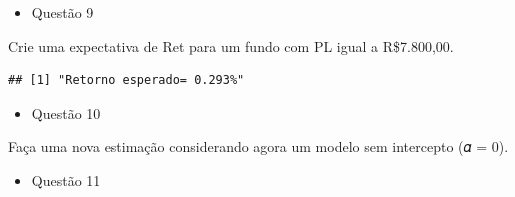 \documentclass[
]{article}
\newenvironment{Shaded}{\begin{snugshade}}{\end{snugshade}}
\newcommand{\AttributeTok}[1]{\textcolor[rgb]{0.77,0.63,0.00}{#1}}
\newcommand{\DecValTok}[1]{\textcolor[rgb]{0.00,0.00,0.81}{#1}}
\newcommand{\FunctionTok}[1]{\textcolor[rgb]{0.00,0.00,0.00}{#1}}
\newcommand{\NormalTok}[1]{#1}
\newcommand{\OtherTok}[1]{\textcolor[rgb]{0.56,0.35,0.01}{#1}}
\newcommand{\SpecialCharTok}[1]{\textcolor[rgb]{0.00,0.00,0.00}{#1}}
\newcommand{\StringTok}[1]{\textcolor[rgb]{0.31,0.60,0.02}{#1}}
\providecommand{\tightlist}{%
  \setlength{\itemsep}{0pt}\setlength{\parskip}{0pt}}
\begin{document}
\begin{itemize}
\tightlist
\item
  Questão 9
\end{itemize}

Crie uma expectativa de Ret para um fundo com PL igual a R\$7.800,00.

\begin{Shaded}
\end{Shaded}

\begin{verbatim}
## [1] "Retorno esperado= 0.293%"
\end{verbatim}

\begin{itemize}
\tightlist
\item
  Questão 10
\end{itemize}

Faça uma nova estimação considerando agora um modelo sem intercepto (𝛼 =
0).

\begin{Shaded}
\end{Shaded}

\begin{itemize}
\tightlist
\item
  Questão 11
\end{itemize}
\end{document}
